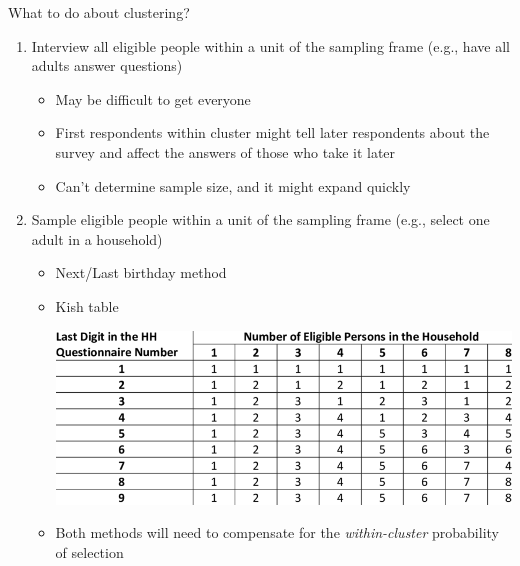 \documentclass[11pt]{lecturenotes}
\begin{document}
\slide
{}

What to do about clustering? 
\begin{enumerate}[nolistsep]
\item Interview all eligible people within a unit of the sampling frame (e.g., have all adults answer questions)
\begin{itemize}
\item May be difficult to get everyone
\item First respondents within cluster might tell later respondents about the survey and affect the answers of those who take it later
\item Can't determine sample size, and it might expand quickly
\end{itemize}
\item Sample eligible people within a unit of the sampling frame (e.g., select one adult in a household)
\begin{itemize}
\item Next\slash Last birthday method
\item Kish table

\slide
\begin{center}
\includegraphics[scale=.9]{../images/Table-2-The-ILO-Modified-Kish-Grid.png}
\end{center}
\item Both methods will need to compensate for the \emph{within-cluster} probability of selection
\end{itemize}
\end{enumerate}

\slide
{}
\end{document}
